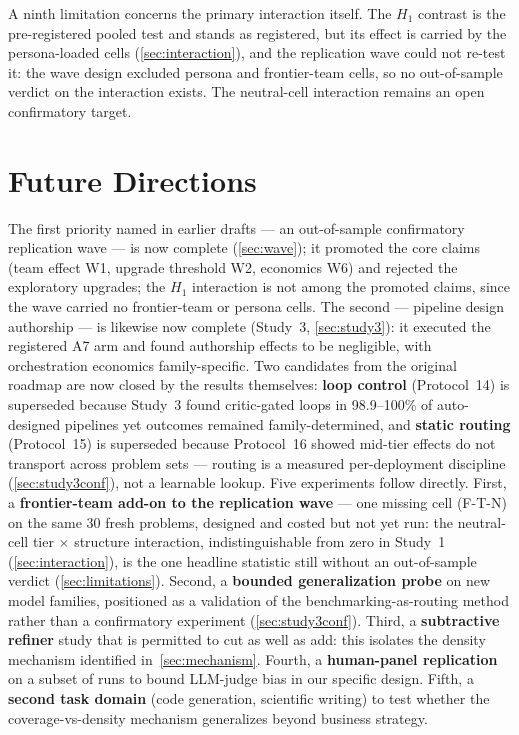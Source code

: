 \documentclass[12pt,a4paper]{article}
\begin{document}
A ninth limitation concerns the primary interaction itself. The $H_1$
contrast is the pre-registered pooled test and stands as registered, but its
effect is carried by the persona-loaded cells (\cref{sec:interaction}), and
the replication wave could not re-test it: the wave design excluded persona
and frontier-team cells, so no out-of-sample verdict on the interaction
exists. The neutral-cell interaction remains an open confirmatory target.

\section{Future Directions}\label{sec:future}

The first priority named in earlier drafts --- an out-of-sample confirmatory
replication wave --- is now complete (\cref{sec:wave}); it promoted the core
claims (team effect W1, upgrade threshold W2, economics W6) and rejected the
exploratory upgrades; the $H_1$ interaction is not among the promoted claims,
since the wave carried no frontier-team or persona cells. The second --- pipeline design
authorship --- is likewise now complete (Study~3, \cref{sec:study3}): it
executed the registered A7 arm and found authorship effects to be negligible,
with orchestration economics family-specific. Two candidates from the original roadmap are now closed by the results
themselves: \textbf{loop control} (Protocol~14) is superseded because
Study~3 found critic-gated loops in 98.9--100\% of auto-designed
pipelines yet outcomes remained family-determined, and \textbf{static
routing} (Protocol~15) is superseded because Protocol~16 showed mid-tier
effects do not transport across problem sets --- routing is a measured
per-deployment discipline (\cref{sec:study3conf}), not a learnable
lookup. Five experiments follow directly. First, a \textbf{frontier-team
add-on to the replication wave} --- one missing cell (F-T-N) on the same 30
fresh problems, designed and costed but not yet run: the neutral-cell tier
$\times$ structure interaction, indistinguishable from zero in Study~1
(\cref{sec:interaction}), is the one headline statistic still without an
out-of-sample verdict (\cref{sec:limitations}). Second, a \textbf{bounded
generalization probe} on new model families, positioned as a validation
of the benchmarking-as-routing method rather than a confirmatory
experiment (\cref{sec:study3conf}). Third, a \textbf{subtractive
refiner} study that is permitted to cut as well as add: this isolates
the density mechanism identified in~\cref{sec:mechanism}. Fourth, a
\textbf{human-panel replication} on a subset of runs to bound LLM-judge
bias in our specific design. Fifth, a \textbf{second task domain} (code
generation, scientific writing) to test whether the
coverage-vs-density mechanism generalizes beyond business strategy.
\end{document}
